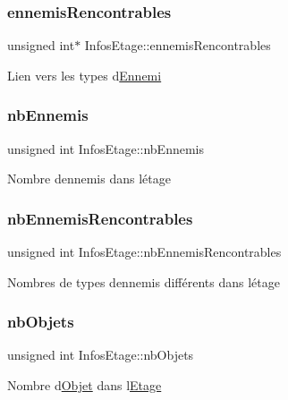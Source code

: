 \subsubsection{\texorpdfstring{ennemis\+Rencontrables}{ennemisRencontrables}}
{\footnotesize\ttfamily unsigned int$\ast$ Infos\+Etage\+::ennemis\+Rencontrables}

Lien vers les types d\textquotesingle{}\mbox{\hyperlink{classEnnemi}{Ennemi}} \mbox{\label{structInfosEtage_ad9dcebb01373d07c952586c77479d336}} 
\subsubsection{\texorpdfstring{nb\+Ennemis}{nbEnnemis}}
{\footnotesize\ttfamily unsigned int Infos\+Etage\+::nb\+Ennemis}

Nombre d\textquotesingle{}ennemis dans l\textquotesingle{}étage \mbox{\label{structInfosEtage_a532fd49311811ed1830828629c977316}} 
\subsubsection{\texorpdfstring{nb\+Ennemis\+Rencontrables}{nbEnnemisRencontrables}}
{\footnotesize\ttfamily unsigned int Infos\+Etage\+::nb\+Ennemis\+Rencontrables}

Nombres de types d\textquotesingle{}ennemis différents dans l\textquotesingle{}étage \mbox{\label{structInfosEtage_a21e0f92d5bee26ae5fce62c799768495}} 
\subsubsection{\texorpdfstring{nb\+Objets}{nbObjets}}
{\footnotesize\ttfamily unsigned int Infos\+Etage\+::nb\+Objets}

Nombre d\textquotesingle{}\mbox{\hyperlink{structObjet}{Objet}} dans l\textquotesingle{}\mbox{\hyperlink{classEtage}{Etage}} \mbox{\label{structInfosEtage_ac5ca4457a9300a09e643e8ca6f7ef5e9}} 
